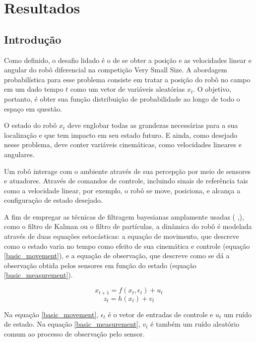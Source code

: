 \documentclass[a4paper,11pt]{article}
\begin{document}
\section{Resultados}

\subsection{Introdução}

Como definido, o desafio lidado é o de se obter a posição e as velocidades linear e angular do robô diferencial na competição Very Small Size. A abordagem probabilística para esse problema consiste em tratar a posição do robô no campo em um dado tempo $t$ como um vetor de variáveis aleatórias $x_t$. O objetivo, portanto, é obter sua função distribuição de probabilidade ao longo de todo o espaço em questão.

O estado do robô $x_t$ deve englobar todas as grandezas necessárias para a sua localização e que tem impacto em seu estado futuro. E ainda, como desejado nesse problema, deve conter variáveis cinemáticas, como velocidades lineares e angulares.

Um robô interage com o ambiente através de sua percepção por meio de sensores e atuadores. Através de comandos de controle, incluindo sinais de referência tais como a velocidade linear, por exemplo, o robô se move, posiciona, e alcança a configuração de estado desejado.

A fim de empregar as técnicas de filtragem bayesianas amplamente usadas (\cite{P.Robotics} ,\cite{nonlinear_filtering}), como o filtro de Kalman ou o filtro de partículas, a dinâmica do robô é modelada através de duas equações estocásticas: a equação de movimento, que descreve como o estado varia no tempo como efeito de sua cinemática e controle (equação \eqref{basic_movement}), e a equação de observação, que descreve como se dá a observação obtida pelos sensores em função do estado (equação \eqref{basic_measurement}).


\begin{equation}
\label{basic_movement}
x_{t+1}=f(x_t,\epsilon_t)+u_t
\end{equation}
\begin{equation}
\label{basic_measurement}
z_t=h(x_t)+v_t
\end{equation}

 Na equação \eqref{basic_movement}, $\epsilon_t$ é o vetor de entradas de controle e $u_t$ um ruído de estado. Na equação \eqref{basic_measurement}, $v_t$ é também um ruído aleatório comum ao processo de observação pelo sensor.
\end{document}
